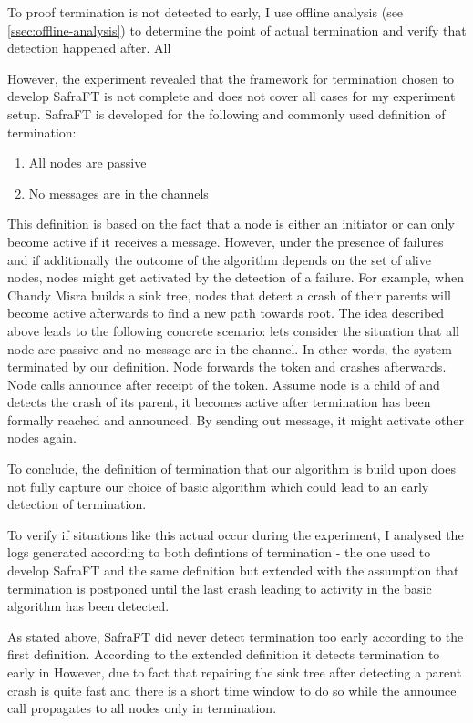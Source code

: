 To proof termination is not detected to early, I use offline analysis (see \cref{ssec:offline-analysis}) to determine the point of actual termination and verify that detection happened after.
All %

However, the experiment revealed that the framework for termination chosen to develop SafraFT is not complete and does not cover all cases for my experiment setup.
SafraFT is developed for the following and commonly used definition of termination:
\begin{enumerate}
	\item All nodes are passive
	\item No messages are in the channels
\end{enumerate}
This definition is based on the fact that a node is either an initiator or can only become active if it receives a message. 
However, under the presence of failures and if additionally the outcome of the algorithm depends on the set of alive nodes, nodes might get activated by the detection of a failure.
For example, when Chandy Misra builds a sink tree, nodes that detect a crash of their parents will become active afterwards to find a new path towards root.
The idea described above leads to the following concrete scenario: lets consider the situation that all node are passive and no message are in the channel. 
In other words, the system terminated by our definition.
Node  forwards the token and crashes afterwards. 
Node  calls announce after receipt of the token.
Assume node  is a child of  and detects the crash of its parent, it becomes active after termination has been formally reached and announced.
By sending out  message, it might activate other nodes again.

To conclude, the definition of termination that our algorithm is build upon does not fully capture our choice of basic algorithm which could lead to an early detection of termination.

To verify if situations like this actual occur during the experiment, I analysed the logs generated according to both defintions of termination - the one used to develop SafraFT and the same definition but extended with the assumption that termination is postponed until the last crash leading to activity in the basic algorithm has been detected.

As stated above, SafraFT did never detect termination too early according to the first definition.
According to the extended definition it detects termination to early in %
However, due to fact that repairing the sink tree after detecting a parent crash is quite fast and there is a short time window to do so while the announce call propagates to all nodes only in %
termination.

